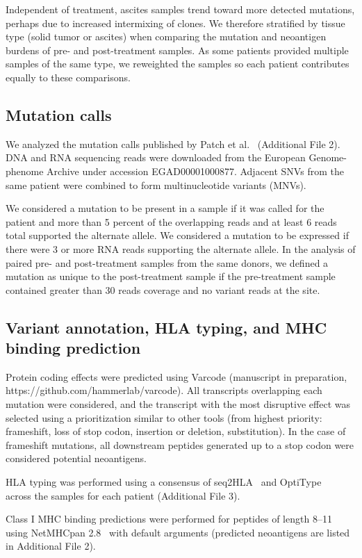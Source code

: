 \documentclass[linenumbers]{bmcart}
\begin{document}
Independent of treatment, ascites samples trend toward more detected mutations, perhaps due to increased intermixing of clones. We therefore stratified by tissue type (solid tumor or ascites) when comparing the mutation and neoantigen burdens of pre- and post-treatment samples. As some patients provided multiple samples of the same type, we reweighted the samples so each patient contributes equally to these comparisons.

\subsection*{Mutation calls}
We analyzed the mutation calls published by Patch et al.~\cite{Patch_2015} (Additional File 2). DNA and RNA sequencing reads were downloaded from the European Genome-phenome Archive under accession EGAD00001000877. Adjacent SNVs from the same patient were combined to form multinucleotide variants (MNVs). 

We considered a mutation to be present in a sample if it was called for the patient and more than 5 percent of the overlapping reads and at least 6 reads total supported the alternate allele. We considered a mutation to be expressed if there were 3 or more RNA reads supporting the alternate allele. In the analysis of paired pre- and post-treatment samples from the same donors, we defined a mutation as unique to the post-treatment sample if the pre-treatment sample contained greater than 30 reads coverage and no variant reads at the site.

\subsection*{Variant annotation, HLA typing, and MHC binding prediction}
\begin{sloppypar}
Protein coding effects were predicted using Varcode (manuscript in preparation, https://github.com/hammerlab/varcode). All transcripts overlapping each mutation were considered, and the transcript with the most disruptive effect was selected using a prioritization similar to other tools (from highest priority: frameshift, loss of stop codon, insertion or deletion, substitution). In the case of frameshift mutations, all downstream peptides generated up to a stop codon were considered potential neoantigens.

HLA typing was performed using a consensus of seq2HLA~\cite{Boegel_2012} and OptiType ~\cite{Szolek_2014} across the samples for each patient (Additional File 3).

Class I MHC binding predictions were performed for peptides of length 8--11 using NetMHCpan 2.8~\cite{Lundegaard_2008} with default arguments (predicted neoantigens are listed in Additional File 2).
\end{sloppypar}
\end{document}

